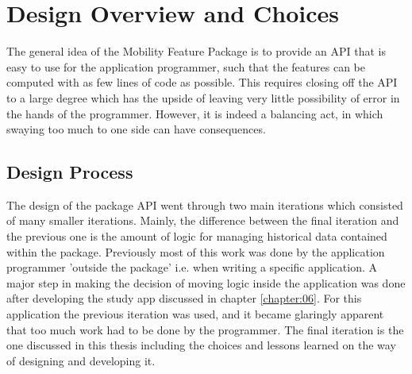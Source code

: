 \section{Design Overview and Choices}
The general idea of the Mobility Feature Package is to provide an API that is easy to use for the application programmer, such that the features can be computed with as few lines of code as possible. This requires closing off the API to a large degree which has the upside of leaving very little possibility of error in the hands of the programmer. However, it is indeed a balancing act, in which swaying too much to one side can have consequences. 

\subsection{Design Process}
The design of the package API went through two main iterations which consisted of many smaller iterations. Mainly, the difference between the final iteration and the previous one is the amount of logic for managing historical data contained within the package. Previously most of this work was done by the application programmer 'outside the package' i.e. when writing a specific application. A major step in making the decision of moving logic inside the application was done after developing the study app discussed in chapter \ref{chapter:06}. For this application the previous iteration was used, and it became glaringly apparent that too much work had to be done by the programmer. The final iteration is the one discussed in this thesis including the choices and lessons learned on the way of designing and developing it.

